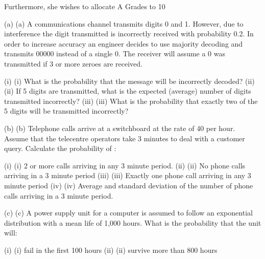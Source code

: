 Furthermore, she wishes to allocate  A Grades to 10%
 
 
 
 
 
 
 

(a)	(a)    A communications channel transmits digits 0 and 1.  However, due to interference the digit transmitted is incorrectly received with probability 0.2.  In order to increase accuracy an engineer decides to use majority decoding and transmits 00000 instead of a single 0.  The receiver will assume a 0 was transmitted if 3 or more zeroes are received. 
 
(i)	(i)                  What is the probability that the message will be incorrectly decoded?
(ii)	(ii)                If 5 digits are transmitted, what is the expected (average) number of digits transmitted incorrectly?
(iii)	(iii)               What is the probability that exactly two of the 5 digits will be transmitted incorrectly?
 

(b)	(b)   Telephone calls arrive at a switchboard at the rate of 40 per hour.  Assume that the telecentre operators take 3 minutes to deal with a customer query.  Calculate the probability of :
 
(i)	(i)                  2 or more calls arriving in any 3 minute period.
(ii)	(ii)                No phone calls arriving in a 3 minute period
(iii)	(iii)               Exactly one phone call arriving in any 3 minute period
(iv)	(iv)              Average and standard deviation of the number of phone calls arriving in a 3 minute period.
 

(c)	(c)    A power supply unit for a computer is assumed to follow an exponential distribution with a mean life of 1,000 hours.  What is the probability that the unit will:
 
(i)	(i)                  fail in the first 100 hours
(ii)	(ii)                survive more than 800 hours
 
